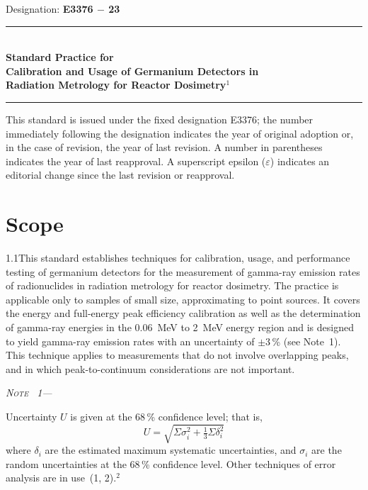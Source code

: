 \documentclass[12pt]{article}
\newenvironment{astmnote}[1][\relax]{%
  \par\smallskip\noindent\textit{N\textsc{ote}%
  \ifx#1\relax\else~#1\fi---}\ignorespaces
}{%
  \par\smallskip
}
\begin{document}
\begin{center}
  {\small Designation: \textbf{E3376 $-$ 23}}\\[1.5ex]
  \rule{\textwidth}{1.5pt}\\[1ex]
  {\LARGE\bfseries Standard Practice for\\[0.4ex]
   Calibration and Usage of Germanium Detectors in\\[0.4ex]
   Radiation Metrology for Reactor Dosimetry$^{1}$}\\[1ex]
  \rule{\textwidth}{1pt}
\end{center}

\noindent
This standard is issued under the fixed designation E3376; the number immediately following
the designation indicates the year of original adoption or, in the case of revision, the year
of last revision. A number in parentheses indicates the year of last reapproval. A superscript
epsilon ($\varepsilon$) indicates an editorial change since the last revision or reapproval.

\section{Scope}

1.1\quad This standard establishes techniques for calibration, usage, and performance
testing of germanium detectors for the measurement of gamma-ray emission rates of
radionuclides in radiation metrology for reactor dosimetry. The practice is applicable
only to samples of small size, approximating to point sources. It covers the energy and
full-energy peak efficiency calibration as well as the determination of gamma-ray energies
in the 0.06~MeV to 2~MeV energy region and is designed to yield gamma-ray emission rates
with an uncertainty of $\pm 3$\,\% (see Note~1). This technique applies to measurements
that do not involve overlapping peaks, and in which peak-to-continuum considerations are
not important.

\begin{astmnote}[1]
Uncertainty $U$ is given at the 68\,\% confidence level; that is,
\[
  U = \sqrt{\Sigma\sigma_i^2 + \tfrac{1}{3}\Sigma\delta_i^2}
\]
where $\delta_i$ are the estimated maximum systematic uncertainties, and $\sigma_i$ are
the random uncertainties at the 68\,\% confidence level. Other techniques of error
analysis are in use~(1, 2).$^{2}$
\end{astmnote}
\end{document}
